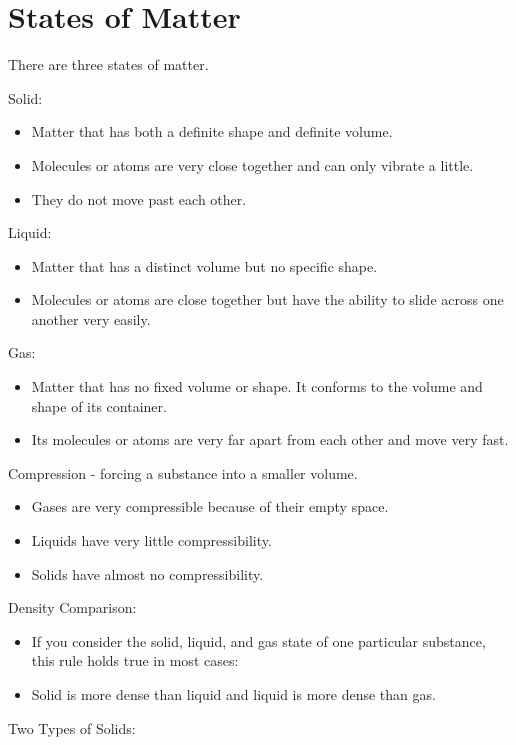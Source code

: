 \documentclass[../hchem.tex]{subfiles}
\begin{document}
\chapter{States of Matter}
There are three states of matter.

Solid:
\begin{itemize}
    \item Matter that has both a definite shape and definite volume.
    \item Molecules or atoms are very close together and can only vibrate a little.
    \item They do not move past each other.
\end{itemize}

Liquid:
\begin{itemize}
    \item Matter that has a distinct volume but no specific shape.
    \item Molecules or atoms are close together but have the ability to slide across one another very easily.
\end{itemize}

Gas:
\begin{itemize}
    \item Matter that has no fixed volume or shape. It conforms to the volume and shape of its container.
    \item Its molecules or atoms are very far apart from each other and move very fast.
\end{itemize}

Compression - forcing a substance into a smaller volume.
\begin{itemize}
    \item Gases are very compressible because of their empty space.
    \item Liquids have very little compressibility.
    \item Solids have almost no compressibility.
\end{itemize}

Density Comparison:
\begin{itemize}
    \item If you consider the solid, liquid, and gas state of one particular substance, this rule holds true in most cases:
    \item Solid is more dense than liquid and liquid is more dense than gas.
\end{itemize}

Two Types of Solids:
\end{document}
